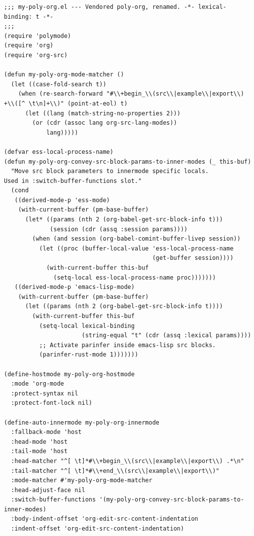 \documentclass[11pt]{article}
\begin{document}
\begin{verbatim}
;;; my-poly-org.el --- Vendored poly-org, renamed. -*- lexical-binding: t -*-
;;;
(require 'polymode)
(require 'org)
(require 'org-src)

(defun my-poly-org-mode-matcher ()
  (let ((case-fold-search t))
    (when (re-search-forward "#\\+begin_\\(src\\|example\\|export\\) +\\([^ \t\n]+\\)" (point-at-eol) t)
      (let ((lang (match-string-no-properties 2)))
        (or (cdr (assoc lang org-src-lang-modes))
            lang)))))

(defvar ess-local-process-name)
(defun my-poly-org-convey-src-block-params-to-inner-modes (_ this-buf)
  "Move src block parameters to innermode specific locals.
Used in :switch-buffer-functions slot."
  (cond
   ((derived-mode-p 'ess-mode)
    (with-current-buffer (pm-base-buffer)
      (let* ((params (nth 2 (org-babel-get-src-block-info t)))
             (session (cdr (assq :session params))))
        (when (and session (org-babel-comint-buffer-livep session))
          (let ((proc (buffer-local-value 'ess-local-process-name
                                          (get-buffer session))))
            (with-current-buffer this-buf
              (setq-local ess-local-process-name proc)))))))
   ((derived-mode-p 'emacs-lisp-mode)
    (with-current-buffer (pm-base-buffer)
      (let ((params (nth 2 (org-babel-get-src-block-info t))))
        (with-current-buffer this-buf
          (setq-local lexical-binding
                      (string-equal "t" (cdr (assq :lexical params))))
          ;; Activate parinfer inside emacs-lisp src blocks.
          (parinfer-rust-mode 1)))))))

(define-hostmode my-poly-org-hostmode
  :mode 'org-mode
  :protect-syntax nil
  :protect-font-lock nil)

(define-auto-innermode my-poly-org-innermode
  :fallback-mode 'host
  :head-mode 'host
  :tail-mode 'host
  :head-matcher "^[ \t]*#\\+begin_\\(src\\|example\\|export\\) .*\n"
  :tail-matcher "^[ \t]*#\\+end_\\(src\\|example\\|export\\)"
  :mode-matcher #'my-poly-org-mode-matcher
  :head-adjust-face nil
  :switch-buffer-functions '(my-poly-org-convey-src-block-params-to-inner-modes)
  :body-indent-offset 'org-edit-src-content-indentation
  :indent-offset 'org-edit-src-content-indentation)


\end{verbatim}
\end{document}
